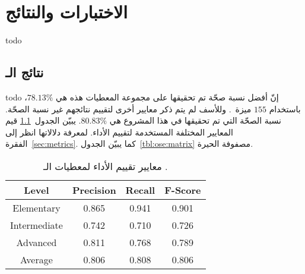 

\chapter{الاختبارات والنتائج}
todo

\section{نتائج الـ }
todo
إنّ أفضل نسبة صحّة تم تحقيقها على مجموعة المعطيات هذه هي $78.13\%$،
باستخدام $155$ ميزة~\cite{vajjala2018}.
وللأسف لم يتم ذكر معايير أخرى لتقييم نتائجهم غير نسبة الصحّة.
نسبة الصحّة التي تم تحقيقها في هذا المشروع هي $80.83\%$.
يبيّن الجدول~\ref{tbl:ose:metrics} قيم المعايير المختلفة المستخدمة لتقييم الأداء.
لمعرفة دلالاتها انظر إلى الفقرة~\ref{sec:metrics}.
كما يبيّن الجدول~\ref{tbl:ose:matrix} مصفوفة الحيرة.
\begin{table}[htb]
	\centering
	{
		\setlength{\tabcolsep}{0.5em} %
		\renewcommand{\arraystretch}{1.4}%
		
		\begin{tabular}{|c|c|c|c|}
			\hline
			
			Level &
			Precision &
			Recall &
			F-Score \\
			\hline
			
			Elementary &
			0.865 &
			0.941 &
			0.901 \\
			\hline
			
			Intermediate &
			0.742 &
			0.710 &
			0.726 \\
			\hline
			
			Advanced &
			0.811 &
			0.768 &
			0.789 \\
			\hline
			
			Average &
			0.806 &
			0.808 &
			0.806 \\
			\hline
			
		\end{tabular}
	}
	\caption{%
		معايير تقييم الأداء لمعطيات الـ .
	}
	\label{tbl:ose:metrics}
\end{table}

